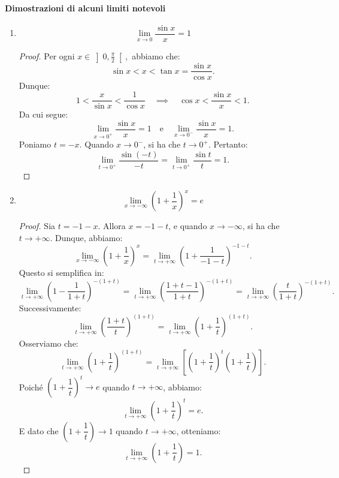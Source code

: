 \documentclass{article}
\theoremstyle{plain}
\theoremstyle{definition}
\theoremstyle{remark}
\begin{document}
\vspace{10pt}

\paragraph{Dimostrazioni di alcuni limiti notevoli}
\begin{enumerate}
    \item \[\lim_{x\to0}\dfrac{\sin x}{x}=1\] 
    \begin{proof}
        Per ogni \( x \in \left]0, \frac{\pi}{2}\right[, \) abbiamo che:
        \[
        \sin x < x < \tan x = \frac{\sin x}{\cos x}.
        \]
        Dunque:
        \[
        1 < \dfrac{x}{\sin x} < \dfrac{1}{\cos x} \quad \implies \quad \cos x < \dfrac{\sin x}{x} < 1.
        \]
        Da cui segue:
        \[
        \lim_{x \to 0^+} \dfrac{\sin x}{x} = 1 \quad \text{e} \quad \lim_{x \to 0^-} \dfrac{\sin x}{x} = 1.
        \]
        Poniamo \( t = -x \). Quando \( x \to 0^- \), si ha che \( t \to 0^+ \). Pertanto:
        \[
        \lim_{t \to 0^+} \dfrac{\sin(-t)}{-t} = \lim_{t \to 0^+} \dfrac{\sin t}{t} = 1.
        \]
    \end{proof}
    \item \[\lim_{x\to-\infty}\left(1+\frac{1}{x}\right)^x=e\]
    \begin{proof}
        Sia \( t = -1 - x \). Allora \( x = -1 - t \), e quando \( x \to -\infty \), si ha che \( t \to +\infty \). Dunque, abbiamo:
        \[
        \lim_{x \to -\infty}\left(1 + \dfrac{1}{x}\right)^x = \lim_{t \to +\infty}\left(1 + \dfrac{1}{-1 - t}\right)^{-1 - t}.
        \]
        Questo si semplifica in:
        \[
        \lim_{t \to +\infty}\left(1 - \dfrac{1}{1 + t}\right)^{-(1 + t)} = \lim_{t \to +\infty}\left(\dfrac{1 + t - 1}{1 + t}\right)^{-(1 + t)} = \lim_{t \to +\infty}\left(\dfrac{t}{1 + t}\right)^{-(1 + t)}.
        \]
        Successivamente:
        \[
        \lim_{t \to +\infty}\left(\dfrac{1 + t}{t}\right)^{(1 + t)} = \lim_{t \to +\infty}\left(1 + \dfrac{1}{t}\right)^{(1 + t)}.
        \]
        Osserviamo che:
        \[
        \lim_{t \to +\infty}\left(1 + \dfrac{1}{t}\right)^{(1 + t)} = \lim_{t \to +\infty}\left[\left(1 + \dfrac{1}{t}\right)^t\left(1 + \dfrac{1}{t}\right)\right].
        \]
        Poiché \( \left(1 + \dfrac{1}{t}\right)^t \to e \) quando \( t \to +\infty \), abbiamo:
        \[
        \lim_{t \to +\infty}\left(1 + \dfrac{1}{t}\right)^t = e.
        \]
        E dato che \( \left(1 + \dfrac{1}{t}\right) \to 1 \) quando \( t \to +\infty \), otteniamo:
        \[
        \lim_{t \to +\infty}\left(1 + \dfrac{1}{t}\right) = 1.
\]
\end{proof}
\end{enumerate}
\end{document}
